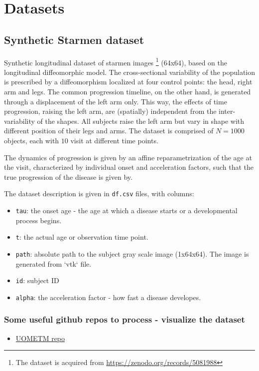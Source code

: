 \section{Datasets}
\label{sec:dataset}

\subsection{Synthetic Starmen dataset}

Synthetic longitudinal dataset of starmen images \footnote{The dataset is acquired from \href{https://zenodo.org/records/5081988}{https://zenodo.org/records/5081988}} (64x64), based on the longitudinal diffeomorphic model. The cross-sectional variability of the population is prescribed by a diffeomorphism localized at four control points: the head, right arm and legs. The common progression timeline, on the other hand, is generated through a displacement of the left arm only.
This way, the effects of time progression, raising the left arm, are (spatially) independent from the inter-variability of the shapes. All subjects raise the left arm but vary in shape with different position of their legs and arms. The dataset is comprised of $N=1000$ objects, each with $10$ visit at different time points. 

The dynamics of progression is given by an affine reparametrization of the age at the visit, characterized by individual onset and acceleration factors, such that the true progression of the disease is given by. 

The dataset description is given in \verb|df.csv| files, with columns: 

\begin{itemize}
    \item \texttt{tau}:  the onset age - the age at which a disease starts or a developmental process begins.
    
    \item \texttt{t}: the actual age or observation time point.
    
    \item \texttt{path}: absolute path to the subject gray scale image (1x64x64). The image is generated from `vtk` file. 
    
    \item \texttt{id}: subject ID

    \item \texttt{alpha}: the acceleration factor - how fast a disease developes. 
    
\end{itemize}

\subsubsection{Some useful github repos to process - visualize the dataset}

\begin{itemize}
    \item \href{https://github.com/MChen808/UOMETM/tree/main}{UOMETM repo}

\end{itemize}
